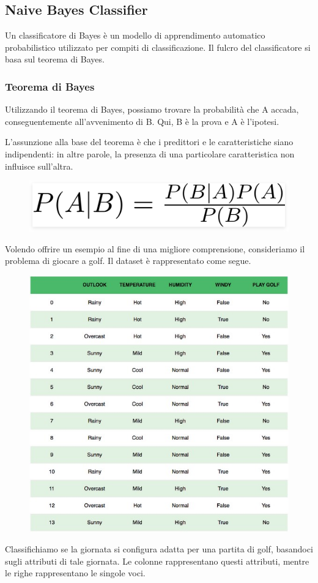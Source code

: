 \subsection{Naive Bayes Classifier}
\cite{NaiveBayesClassTowardDataScience}
Un classificatore di Bayes è un modello di apprendimento automatico probabilistico utilizzato per compiti di classificazione. Il fulcro del classificatore si basa sul teorema di Bayes.


\subsubsection{Teorema di Bayes}
Utilizzando il teorema di Bayes, possiamo trovare la probabilità che A accada, conseguentemente all’avvenimento di B. Qui, B è la prova e A è l'ipotesi. 

L'assunzione alla base del teorema è che i predittori e le caratteristiche siano indipendenti: in altre parole, la presenza di una particolare caratteristica non influisce sull'altra.
\begin{figure}
    \begin{center}    
        \includegraphics[width=0.9\linewidth]{images/image17.png}
    \end{center}
\end{figure}
Volendo oﬀrire un esempio al fine di una migliore comprensione, consideriamo il problema di giocare a golf.  Il dataset è rappresentato come segue.
\newpage
\begin{figure}
    \begin{center}    
        \includegraphics[width=0.9\linewidth]{images/image18.jpeg}
    \end{center}
\end{figure}
Classifichiamo se la giornata si configura adatta per una partita di golf, basandoci sugli attributi di tale giornata. Le colonne rappresentano questi attributi, mentre le righe rappresentano le singole voci.

